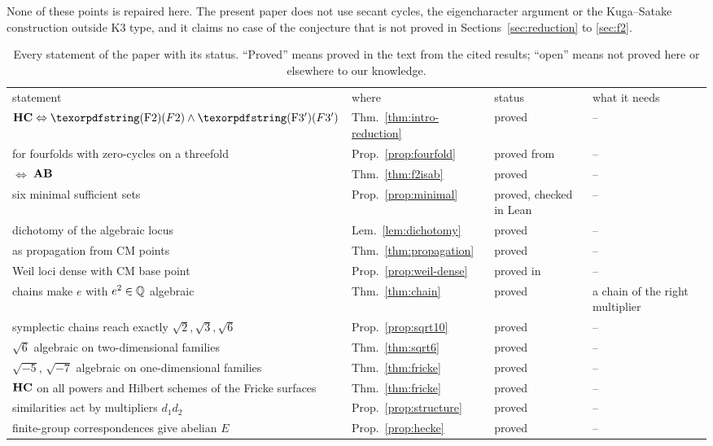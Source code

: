 None of these points is repaired here. The present paper does not use secant cycles, the eigencharacter argument or the Kuga--Satake construction outside K3 type, and it claims no case of the conjecture that is not proved in Sections~\ref{sec:reduction} to \ref{sec:f2}.

\begin{table}[hbt!]
\centering
\caption{Every statement of the paper with its status. ``Proved'' means proved in the text from the cited results; ``open'' means not proved here or elsewhere to our knowledge.}
\label{tab:status}
\begin{ruledtabular}
\begin{tabular}{llll}
statement & where & status & what it needs \\
\colrule
$\HC\Leftrightarrow\Fii{}\wedge\Fiii{}$ & Thm.~\ref{thm:intro-reduction} & proved & -- \\
\Fiii{} for fourfolds with zero-cycles on a threefold & Prop.~\ref{prop:fourfold} & proved from \cite{BS83} & -- \\
\Fii{} $\Leftrightarrow$ $\mathbf{AB}$ & Thm.~\ref{thm:f2isab} & proved & -- \\
six minimal sufficient sets & Prop.~\ref{prop:minimal} & proved, checked in Lean & -- \\
dichotomy of the algebraic locus & Lem.~\ref{lem:dichotomy} & proved & -- \\
\Fii{} as propagation from CM points & Thm.~\ref{thm:propagation} & proved & -- \\
Weil loci dense with CM base point & Prop.~\ref{prop:weil-dense} & proved in \cite{BMB26} & -- \\
chains make $e$ with $e^{2}\in\mathbb{Q}$ algebraic & Thm.~\ref{thm:chain} & proved & a chain of the right multiplier \\
symplectic chains reach exactly $\sqrt2,\sqrt3,\sqrt6$ & Prop.~\ref{prop:sqrt10} & proved & -- \\
$\sqrt6$ algebraic on two-dimensional families & Thm.~\ref{thm:sqrt6} & proved & -- \\
$\sqrt{-5}$, $\sqrt{-7}$ algebraic on one-dimensional families & Thm.~\ref{thm:fricke} & proved & -- \\
$\mathbf{HC}$ on all powers and Hilbert schemes of the Fricke surfaces & Thm.~\ref{thm:fricke} & proved & -- \\
similarities act by multipliers $d_{1}d_{2}$ & Prop.~\ref{prop:structure} & proved & -- \\
finite-group correspondences give abelian $E$ & Prop.~\ref{prop:hecke} & proved & -- \\

\end{tabular}
\end{ruledtabular}
\end{table}
